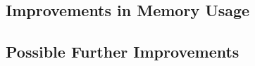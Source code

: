 \documentclass[journal, a4paper]{IEEEtran}
\begin{document}
\subsection{Improvements in Memory Usage}

\subsection{Possible Further Improvements}


\end{document}
